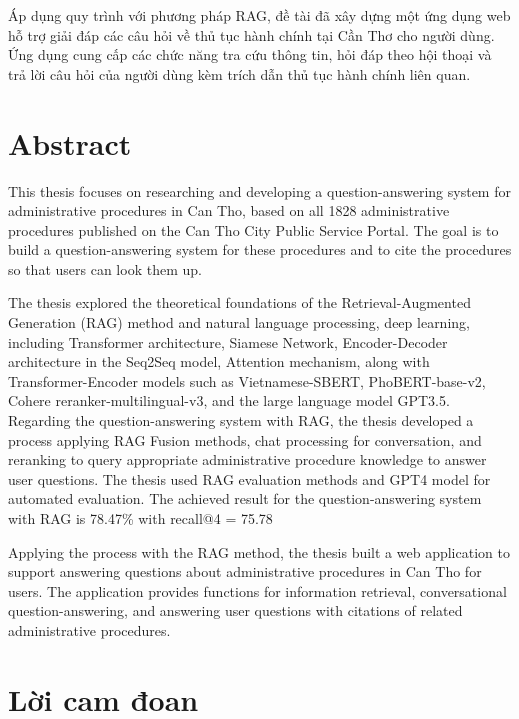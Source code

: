 \documentclass[a4paper, 12pt, openany]{book}
\begin{document}
Áp dụng quy trình với phương pháp RAG, đề tài đã xây dựng một ứng dụng web hỗ trợ giải đáp các câu hỏi về thủ tục hành chính tại Cần Thơ cho người dùng.
Ứng dụng cung cấp các chức năng tra cứu thông tin, hỏi đáp theo hội thoại và trả lời câu hỏi của người dùng kèm trích dẫn thủ tục hành chính liên quan.

\chapter*{Abstract}

This thesis focuses on researching and developing a question-answering system for administrative procedures in Can Tho, based on all 1828 administrative procedures published on the Can Tho City Public Service Portal. The goal is to build a question-answering system for these procedures and to cite the procedures so that users can look them up.

The thesis explored the theoretical foundations of the Retrieval-Augmented Generation (RAG) method and natural language processing, deep learning, including Transformer architecture, Siamese Network, Encoder-Decoder architecture in the Seq2Seq model, Attention mechanism, along with Transformer-Encoder models such as Vietnamese-SBERT, PhoBERT-base-v2, Cohere reranker-multilingual-v3, and the large language model GPT3.5. Regarding the question-answering system with RAG, the thesis developed a process applying RAG Fusion methods, chat processing for conversation, and reranking to query appropriate administrative procedure knowledge to answer user questions. The thesis used RAG evaluation methods and GPT4 model for automated evaluation. The achieved result for the question-answering system with RAG is 78.47\% with recall@4 = 75.78%

Applying the process with the RAG method, the thesis built a web application to support answering questions about administrative procedures in Can Tho for users. The application provides functions for information retrieval, conversational question-answering, and answering user questions with citations of related administrative procedures.

\chapter*{Lời cam đoan}


\tableofcontents
\listoffigures
\listoftables
\end{document}
